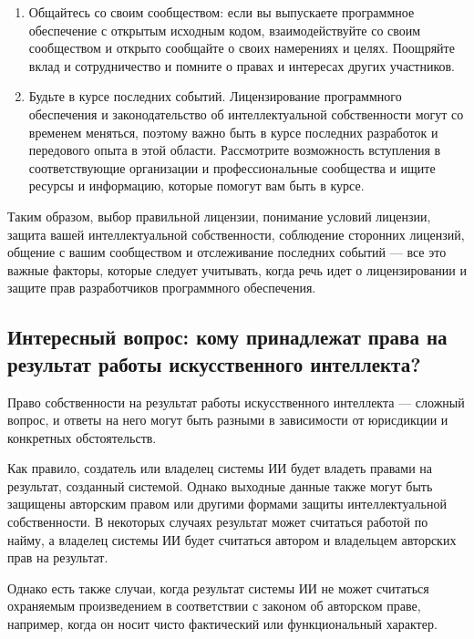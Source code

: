 \documentclass[letterpaper,10pt,russian]{sphinxmanual}
\begin{document}
\begin{enumerate}
\item {} 
\sphinxAtStartPar
Общайтесь со своим сообществом: если вы выпускаете программное обеспечение с открытым исходным кодом, взаимодействуйте со своим сообществом и открыто сообщайте о своих намерениях и целях. Поощряйте вклад и сотрудничество и помните о правах и интересах других участников.

\item {} 
\sphinxAtStartPar
Будьте в курсе последних событий. Лицензирование программного обеспечения и законодательство об интеллектуальной собственности могут со временем меняться, поэтому важно быть в курсе последних разработок и передового опыта в этой области. Рассмотрите возможность вступления в соответствующие организации и профессиональные сообщества и ищите ресурсы и информацию, которые помогут вам быть в курсе.

\end{enumerate}

\sphinxAtStartPar
Таким образом, выбор правильной лицензии, понимание условий лицензии, защита вашей интеллектуальной собственности, соблюдение сторонних лицензий, общение с вашим сообществом и отслеживание последних событий — все это важные факторы, которые следует учитывать, когда речь идет о лицензировании и защите прав разработчиков программного обеспечения.


\subsection{Интересный вопрос: кому принадлежат права на результат работы искусственного интеллекта?}
\label{\detokenize{educational_materials/open_license/content:id6}}
\sphinxAtStartPar
Право собственности на результат работы искусственного интеллекта — сложный вопрос, и ответы на него могут быть разными в зависимости от юрисдикции и конкретных обстоятельств.

\sphinxAtStartPar
Как правило, создатель или владелец системы ИИ будет владеть правами на результат, созданный системой. Однако выходные данные также могут быть защищены авторским правом или другими формами защиты интеллектуальной собственности. В некоторых случаях результат может считаться работой по найму, а владелец системы ИИ будет считаться автором и владельцем авторских прав на результат.

\sphinxAtStartPar
Однако есть также случаи, когда результат системы ИИ не может считаться охраняемым произведением в соответствии с законом об авторском праве, например, когда он носит чисто фактический или функциональный характер.
\end{document}
